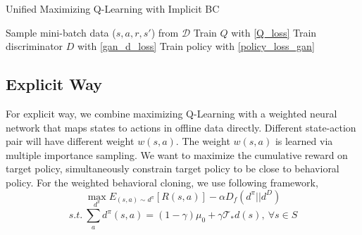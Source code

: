 \documentclass[nohyperref]{article}
\theoremstyle{plain}
\theoremstyle{definition}
\theoremstyle{remark}
\begin{document}
\begin{algorithm}[tb]
   \caption{Unified Maximizing Q-Learning with Implicit BC}
   \label{alg:ImBC}
\begin{algorithmic}
   \REPEAT
   \STATE Sample mini-batch data ($s,a,r,s\prime$) from $\mathcal{D}$
   \STATE Train $Q$ with \eqref{Q_loss}
   \STATE Train discriminator $D$ with \eqref{gan_d_loss}
   \STATE Train policy with \eqref{policy_loss_gan}
   \ENDFOR
\end{algorithmic}
\end{algorithm}


\subsection{Explicit Way}

For explicit way, we combine maximizing Q-Learning with a weighted neural network that maps states to actions in offline data directly. Different state-action pair will have different weight $w(s,a)$. The weight $w(s,a)$ is learned via multiple importance sampling. We want to maximize the cumulative reward on target policy, simultaneously constrain target policy to be close to behavioral policy. For the weighted behavioral cloning, we use following framework,
\begin{equation}
\label{base_eq}
\underset{d^{\pi}}{\max} E_{(s,a)\sim d^{\pi}}\left[ R( s,a) \right] - \alpha D_f(d^{\pi}||d^D) 
\end{equation}
\begin{equation}
\label{constraint}
s.t.\ \sum_a^{}{d^{\pi}(s,a)}=(1-\gamma) \mu _0+\gamma \mathcal{T}_*d(s), \ \forall s\in S
\end{equation}
\end{document}
